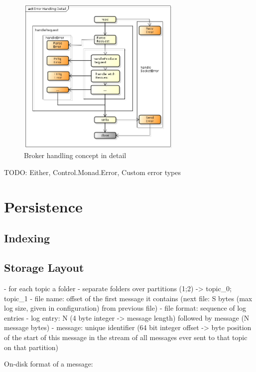 \begin{figure}[H]
    \centering
    \includegraphics[width=0.7\textwidth]{images/broker-error-activity-detail.png}
    \caption{Broker handling concept in detail}
    \label{fig:broker-error-activity-detail.png}
\end{figure}

TODO: Either, Control.Monad.Error, Custom error types

\section{Persistence}

\subsection{Indexing}

\subsection{Storage Layout}

- for each topic a folder
- separate folders over partitions (1;2) -> topic\_0; topic\_1
- file name: offset of the first message it contains (next file: S bytes (max log size, given in configuration) from previous file)
- file format: sequence of log entries
- log entry: N (4 byte integer -> message length) followed by message (N message bytes)
- message: unique identifier (64 bit integer offset -> byte position of the start of this message in the stream of all messages ever sent to that topic on that partition)

On-disk format of a message:

